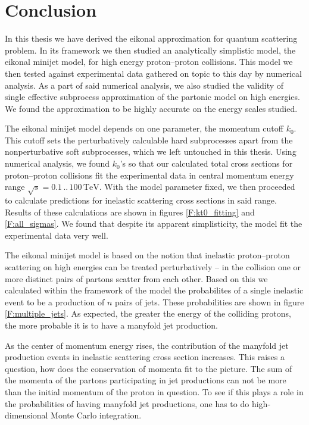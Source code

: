 \documentclass[a4paper, twoside, english, 12pt]{article}
\begin{document}
\section{Conclusion}

In this thesis we have derived the eikonal approximation for quantum scattering problem. In its framework we then studied an analytically simplistic model, the eikonal minijet model, for high energy proton--proton collisions. This model we then tested against experimental data gathered on topic to this day by numerical analysis. As a part of said numerical analysis, we also studied the validity of single effective subprocess approximation of the partonic model on high energies. We found the approximation to be highly accurate on the energy scales studied.

The eikonal minijet model depends on one parameter, the momentum cutoff $k_0$. This cutoff sets the perturbatively calculable hard subprocesses apart from the nonperturbative soft subprocesses, which we left untouched in this thesis. Using numerical analysis, we found $k_0$'s so that our calculated total cross sections for proton--proton collisions fit the experimental data in central momentum energy range $\sqrt{s}=0.1\,..\,100\,\text{TeV}$. With the model parameter fixed, we then proceeded to calculate predictions for inelastic scattering cross sections in said range. Results of these calculations are shown in figures \ref{F:kt0_fitting} and \ref{F:all_sigmas}. We found that despite its apparent simplisticity, the model fit the experimental data very well. 

The eikonal minijet model is based on the notion that inelastic proton--proton scattering on high energies can be treated perturbatively -- in the collision one or more distinct pairs of partons scatter from each other. Based on this we calculated within the framework of the model the probabilites of a single inelastic event to be a production of $n$ pairs of jets. These probabilities are shown in figure \ref{F:multiple_jets}. As expected, the greater the energy of the colliding protons, the more probable it is to have a manyfold jet production. 

As the center of momentum energy rises, the contribution of the manyfold jet production events in inelastic scattering cross section increases. This raises a question, how does the conservation of momenta fit to the picture. The sum of the momenta of the partons participating in jet productions can not be more than the initial momentum of the proton in question. To see if this plays a role in the probabilities of having manyfold jet productions, one has to do high-dimensional Monte Carlo integration. 
\end{document}
